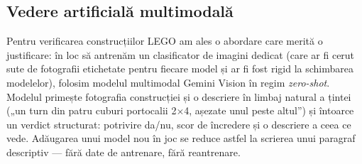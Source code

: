 \subsection{Vedere artificială multimodală}

Pentru verificarea construcțiilor LEGO am ales o abordare care merită o justificare: în loc să antrenăm un clasificator de imagini dedicat (care ar fi cerut sute de fotografii etichetate pentru fiecare model și ar fi fost rigid la schimbarea modelelor), folosim modelul multimodal Gemini Vision în regim \emph{zero-shot}. Modelul primește fotografia construcției și o descriere în limbaj natural a țintei („un turn din patru cuburi portocalii 2$\times$4, așezate unul peste altul”) și întoarce un verdict structurat: potrivire da/nu, scor de încredere și o descriere a ceea ce vede. Adăugarea unui model nou în joc se reduce astfel la scrierea unui paragraf descriptiv — fără date de antrenare, fără reantrenare.
